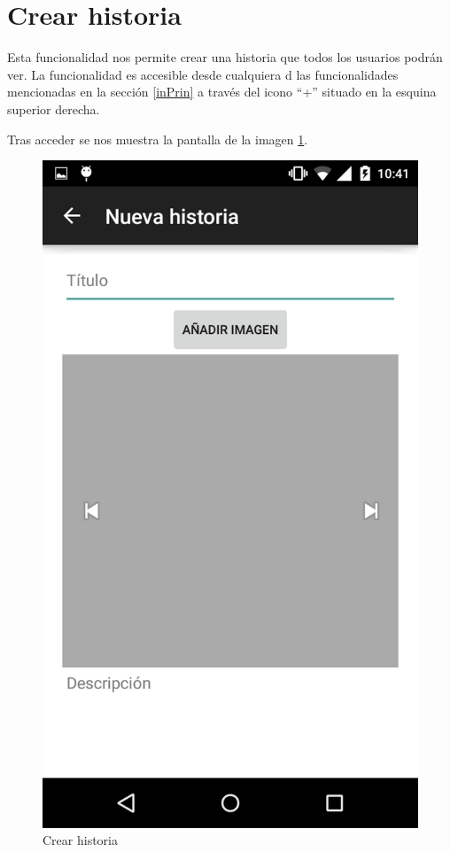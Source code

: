 \documentclass[11pt,a4paper, titlepage]{article}
\begin{document}
	
	\FloatBarrier
	\section{Crear historia}
	Esta funcionalidad nos permite crear una historia que todos los usuarios podrán ver. La funcionalidad es accesible desde cualquiera d las funcionalidades mencionadas en la sección \ref{inPrin} a través del icono ``+'' situado en la esquina superior derecha.
	
	Tras acceder se nos muestra la pantalla de la imagen \ref{p17}.
	\begin{figure}[hbtp]
		\centering
		\includegraphics[scale = 0.25 ]{img/10}
		\caption{Crear historia}
		\label{p17}
	\end{figure}
	
\end{document}
